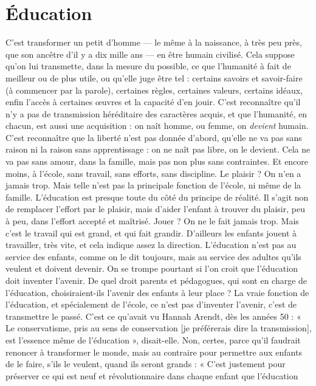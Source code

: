 \section{Éducation}
C’est transformer un petit d'homme — le même à la naissance,
à très peu près, que son ancêtre d’il y a dix mille ans — en être
humain civilisé. Cela suppose qu’on lui transmette, dans la mesure du possible,
ce que l’humanité à fait de meilleur ou de plus utile, ou qu’elle juge être tel :
certains savoirs et savoir-faire (à commencer par la parole), certaines règles, certaines
valeurs, certains idéaux, enfin l’accès à certaines œuvres et la capacité
d’en jouir. C’est reconnaître qu’il n’y a pas de transmission héréditaire des
caractères acquis, et que l’humanité, en chacun, est aussi une acquisition : on
naît homme, ou femme, on {\it devient} humain. C’est reconnaître que la liberté
n'est pas donnée d’abord, qu’elle ne va pas sans raison ni la raison sans
apprentissage : on ne naît pas libre, on le devient. Cela ne va pas sans amour,
dans la famille, mais pas non plus sans contraintes. Et encore moins, à l’école,
sans travail, sans efforts, sans discipline. Le plaisir ? On n’en a jamais trop. Mais
telle n’est pas la principale fonction de l’école, ni même de la famille. L’éducation
est presque toute du côté du principe de réalité. Il s’agit non de remplacer
l'effort par le plaisir, mais d’aider l'enfant à trouver du plaisir, peu à peu, dans
l'effort accepté et maîtrisé. Jouer ? On ne le fait jamais trop. Mais c’est le travail
qui est grand, et qui fait grandir. D'ailleurs les enfants jouent à travailler, très
vite, et cela indique assez la direction. L'éducation n’est pas au service des
enfants, comme on le dit toujours, mais au service des adultes qu’ils veulent et
doivent devenir.
On se trompe pourtant si l’on croit que l’éducation doit inventer l’avenir.
De quel droit parents et pédagogues, qui sont en charge de l'éducation, choisiraient-ils
l'avenir des enfants à leur place ? La vraie fonction de l'éducation, et
spécialement de l’école, ce n’est pas d’inventer l’avenir, c’est de transmettre le
passé. C’est ce qu'avait vu Hannah Arendt, dès les années 50 : « Le conservatisme,
pris au sens de conservation [je préférerais dire la transmission], est
l'essence même de l’éducation », disait-elle. Non, certes, parce qu’il faudrait
renoncer à transformer le monde, mais au contraire pour permettre aux enfants
de le faire, s’ils le veulent, quand ils seront grands : « C’est justement pour préserver
ce qui est neuf et révolutionnaire dans chaque enfant que l’éducation
